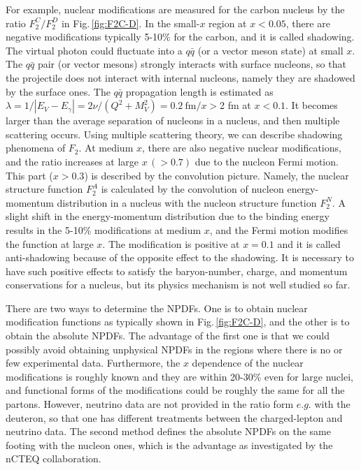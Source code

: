 \documentclass{PoS}
\begin{document}
For example, nuclear modifications are measured for the carbon nucleus
by the ratio $F_2^C / F_2^D$ in Fig.\,\ref{fig:F2C-D}.
In the small-$x$ region at $x<0.05$, there are negative modifications
typically 5-10\% for the carbon, and it is called shadowing.
The virtual photon could fluctuate into a $q\bar q$ (or a vector meson state)
at small $x$. The $q\bar q$ pair (or vector mesons) strongly interacts with
surface nucleons, so that the projectile does not interact with internal
nucleons, namely they are shadowed by the surface ones.
The $q\bar q$ propagation length is estimated as 
$\lambda = 1/|E_V -E_\gamma | = 2 \nu / (Q^2 + M_V^2 ) 
 = 0.2 \ \text{fm} /x >$2 fm at $x<0.1$. 
It becomes larger than the average separation of nucleons in a nucleus,
and then multiple scattering occurs. Using multiple scattering theory,
we can describe shadowing phenomena of $F_2$.
At medium $x$, there are also negative nuclear modifications, and the ratio
increases at large $x\, (>0.7)$ due to the nucleon Fermi motion. 
This part ($x>0.3$) is described by the convolution picture. 
Namely, the nuclear structure function
$F_2^A$ is calculated by the convolution of nucleon energy-momentum
distribution in a nucleus with the nucleon structure 
function $F_2^N$. A slight shift in the energy-momentum distribution
due to the binding energy results in the 5-10\% modifications
at medium $x$, and the Fermi motion modifies the function at large $x$.
The modification is positive at $x =0.1$ and it is called anti-shadowing
because of the opposite effect to the shadowing. It is necessary 
to have such positive effects to satisfy the baryon-number,
charge, and momentum conservations for a nucleus, but its physics
mechanism is not well studied so far.

There are two ways to determine the NPDFs. One is to obtain
nuclear modification functions as typically shown in Fig.\,\ref{fig:F2C-D},
and the other is to obtain the absolute NPDFs.
The advantage of the first one is that we could possibly
avoid obtaining unphysical NPDFs in the regions where there is 
no or few experimental data.
Furthermore, the $x$ dependence of the nuclear modifications is
roughly known and they are within 20-30\% even for large nuclei,
and functional forms of the modifications could be roughly the same 
for all the partons.
However, neutrino data are not provided in the ratio form
$e.g.$ with the deuteron, so that one has different treatments 
between the charged-lepton and neutrino data. 
The second method defines the absolute NPDFs on the same footing with
the nucleon ones, which is the advantage as investigated 
by the nCTEQ collaboration.
\end{document}
